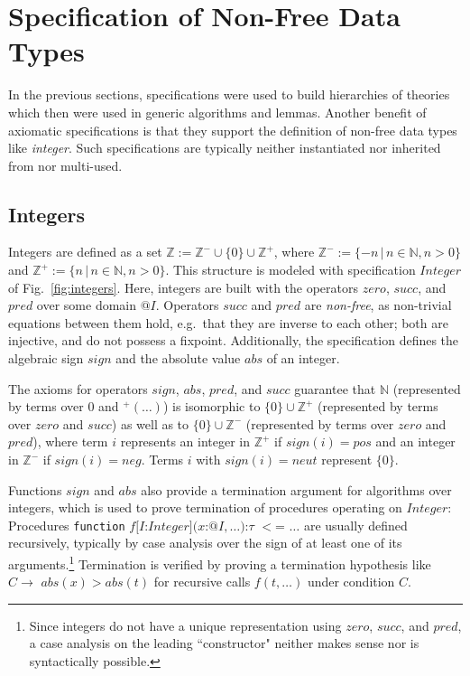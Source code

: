 \documentclass{article}
\theoremstyle{remark}
\theoremstyle{definition}
\newcommand{\NN}{\mathds{N}}
\newcommand{\ZZ}{\mathds{Z}}
\newcommand{\name}[1]{\mathit{#1}}
\begin{document}




\appendix

\section{Specification of Non-Free Data Types} \label{sec:integerarithmetic}

In the previous sections, specifications were used to build hierarchies of theories which then were used in generic
algorithms and lemmas. Another benefit of axiomatic specifications is that they support the definition of non-free data
types like \emph{integer}. Such specifications are typically neither instantiated nor inherited from nor multi-used.


\subsection{Integers}

Integers are defined as a set $\ZZ := \ZZ^- \cup \{0\} \cup \ZZ^+$, where $\ZZ^- := \{-n\, |\, n\in \NN, n>0 \}$ and
$\ZZ^+ := \{n\, |\, n\in \NN, n>0\}$. This structure is modeled with specification $\name{Integer}$ of
Fig.~\ref{fig:integers}. Here, integers are built with the operators $\name{zero}$, $\name{succ}$, and $\name{pred}$
over some domain $@I$. Operators $\name{succ}$ and $\name{pred}$ are \emph{non-free}, as non-trivial equations between
them hold, e.g.\ that they are inverse to each other; both are injective, and do not possess a fixpoint. Additionally,
the specification defines the algebraic sign $\name{sign}$ and the absolute value $\name{abs}$ of an integer.

The axioms for operators $\name{sign}$, $\name{abs}$, $\name{pred}$, and $\name{succ}$ guarantee that $\NN$
(represented by terms over $0$ and $^+(\ldots)$) is isomorphic to $\{0\} \cup \ZZ^+$ (represented by terms over
$\name{zero}$ and $\name{succ}$) as well as to $\{0\} \cup \ZZ^-$ (represented by terms over $\name{zero}$ and
$\name{pred}$), where term $i$ represents an integer in $\ZZ^+$ if $\name{sign}(i)=\name{pos}$ and an integer in
$\ZZ^-$ if $\name{sign}(i)=\name{neg}$. Terms $i$ with $\name{sign}(i)=\name{neut}$ represent $\{0\}$.

Functions $\name{sign}$ and $\name{abs}$ also provide a termination argument for algorithms over integers, which is
used to prove termination of procedures operating on $\name{Integer}$: Procedures \texttt{function}
$f[I$:$\name{Integer}](x$:$@I, \ldots)$:$\tau$ $<$= $\ldots$ are usually defined recursively, typically by case
analysis over the sign of at least one of its arguments.\footnote{Since integers do not have a unique representation
using $\name{zero}$, $\name{succ}$, and $\name{pred}$, a case analysis on the leading ``constructor" neither makes
sense nor is syntactically possible.} Termination is verified by proving a termination hypothesis like $C \rightarrow$
$\name{abs}(x)>\name{abs}(t)$ for recursive calls $f(t,\ldots)$ under condition $C$.
\end{document}
